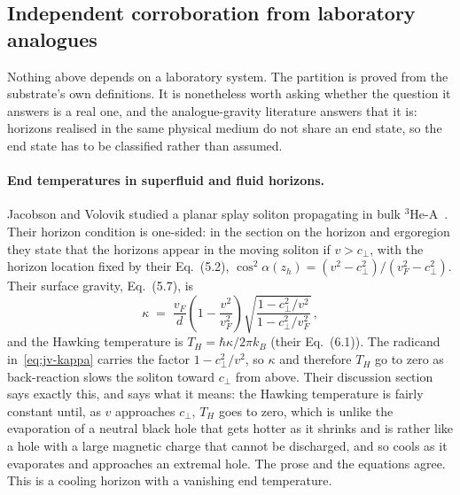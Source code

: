 \documentclass[aps,prd,nofootinbib,superscriptaddress,12pt]{revtex4-2}
\begin{document}
\subsection{Independent corroboration from laboratory analogues}
\label{sec:regime-analogues}

Nothing above depends on a laboratory system. The partition is proved from the
substrate's own definitions. It is nonetheless worth asking whether the
question it answers is a real one, and the analogue-gravity literature answers
that it is: horizons realised in the same physical medium do not share an end
state, so the end state has to be classified rather than assumed.

\paragraph{End temperatures in superfluid and fluid horizons.}
Jacobson and Volovik studied a planar splay soliton propagating in bulk
$^{3}$He-A~\cite{JacobsonVolovik1998}. Their horizon condition is one-sided:
in the section on the horizon and ergoregion they state that the horizons
appear in the moving soliton if $v > c_\perp$, with the horizon location fixed
by their Eq.~(5.2), $\cos^2\!\alpha(z_h) = (v^2 - c_\perp^2)/(v_F^2 -
c_\perp^2)$. Their surface gravity, Eq.~(5.7), is
\begin{equation}
\label{eq:jv-kappa}
\kappa \;=\; \frac{v_F}{d}\left(1 - \frac{v^2}{v_F^2}\right)
\sqrt{\frac{1 - c_\perp^2/v^2}{1 - c_\perp^2/v_F^2}}\,,
\end{equation}
and the Hawking temperature is $T_H = \hbar\kappa/2\pi k_B$ (their Eq.~(6.1)).
The radicand in~\eqref{eq:jv-kappa} carries the factor $1 - c_\perp^2/v^2$, so
$\kappa$ and therefore $T_H$ go to zero as back-reaction slows the soliton
toward $c_\perp$ from above. Their discussion section says exactly this, and
says what it means: the Hawking temperature is fairly constant until, as $v$
approaches $c_\perp$, $T_H$ goes to zero, which is unlike the evaporation of a
neutral black hole that gets hotter as it shrinks and is rather like a hole
with a large magnetic charge that cannot be discharged, and so cools as it
evaporates and approaches an extremal hole. The prose and the equations agree.
This is a cooling horizon with a vanishing end temperature.
\end{document}
